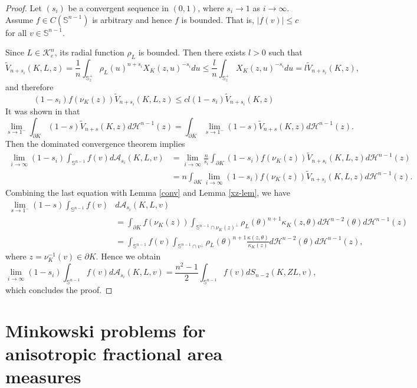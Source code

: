 \documentclass[12pt, oneside,reqno]{amsart}
\numberwithin{equation}{section}
\newtheorem{definition and theorem}[theorem]{Definition and Theorem}
\theoremstyle{plain}
\theoremstyle{remark}
\theoremstyle{definition}
\newcommand{\sn}{{\mathbb S}^{n-1}}
\newcommand{\tk}{\mathcal{K}}
\newcommand{\tH}{\mathcal{H}}
\begin{document}
\begin{proof}
    Let $(s_i)$ be a convergent sequence in $(0,1)$, where $s_i\rightarrow 1$ as $i\rightarrow \infty$. Assume $f\in C(\sn)$ is arbitrary and hence $f$ is bounded. That is,  $|f(v)|\leq c$ for all $v\in\sn$.
    
    Since $L\in\tk_e^n$, its radial function $\rho_L$ is bounded. Then there exists $l>0$ such that
    \[\tilde{V}_{n+s_i}(K,L,z)=\frac{1}{n}\int_{\mathbb S_z^+}\rho_{L}(u)^{n+s_i}X_K(z,u)^{-s_i}du\leq \frac{l}{n}\int_{\mathbb S_z^+}X_K(z,u)^{-s_i}du=l\tilde{V}_{n+s_i}(K,z),\]
    and therefore
    \begin{equation*}
        (1-s_i)f(\nu_K(z))\tilde{V}_{n+s_i}(K,L,z)\leq cl(1-s_i)\tilde{V}_{n+s_i}(K,z)
    \end{equation*}
    It was shown in \cite[Corollary 4.14]{LXYZ2020} that 
    \[\lim_{s\rightarrow 1^-}\int_{\partial K}(1-s)\tilde{V}_{n+s}(K,z)d\tH^{n-1}(z)=\int_{\partial K}\lim_{s\rightarrow 1^-}(1-s)\tilde{V}_{n+s}(K,z)d\tH^{n-1}(z).\]
    Then the dominated convergence theorem implies
    \begin{align*}
        \lim_{i\rightarrow\infty}(1-s_i)\int_{\sn}f(v)d{\mathcal A}_{s_i}(K,L,v)&=\lim_{i\rightarrow\infty}\frac{n}{s_i}\int_{\partial K}(1-s_i)f(\nu_{K}(z))\tilde{V}_{n+s_i}(K,L,z)d\tH^{n-1}(z)\\
        &=n\int_{\partial K}\lim_{i\rightarrow \infty} (1-s_i) f(\nu_{K}(z))\tilde{V}_{n+s_i}(K,L,z)d\tH^{n-1}(z).
    \end{align*}
    Combining the last equation with Lemma \ref{conv} and Lemma \ref{xz-lem}, we have
    \begin{align*}
        \lim_{s\rightarrow 1^-}(1-s)\int_{\sn}f(v)&d{\mathcal A}_{s_i}(K,L,v)\\
        &=\int_{\partial K}f(\nu_K(z))\int_{\sn\cap \nu_K(z)^{\perp}}\rho_L(\theta)^{n+1}\kappa_K(z,\theta)d\tH^{n-2}(\theta)d\tH^{n-1}(z)\\
        &=\int_{\sn}f(v)\int_{\sn\cap v^{\perp}}\rho_L(\theta)^{n+1}\frac{\kappa(z,\theta)}{\kappa_{K}(z)}d\tH^{n-2}(\theta)d\tH^{n-1}(z),
    \end{align*}
    where $z=\nu_K^{-1}(v)\in\partial K$. Hence we obtain
    \[\lim_{i\rightarrow \infty}(1-s_i)\int_{\sn}f(v)d{\mathcal A}_{s_i}(K,L,v)=\frac{n^2-1}{2}\int_{\sn}f(v)dS_{n-2}(K,ZL,v),\]
    which concludes the proof.
\end{proof}

\section{Minkowski problems for anisotropic fractional area measures}
\end{document}
